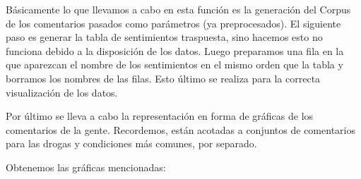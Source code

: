 \documentclass[spanish,]{article}
\newenvironment{Shaded}{\begin{snugshade}}{\end{snugshade}}
\newcommand{\KeywordTok}[1]{\textcolor[rgb]{0.13,0.29,0.53}{\textbf{#1}}}
\newcommand{\StringTok}[1]{\textcolor[rgb]{0.31,0.60,0.02}{#1}}
\newcommand{\ControlFlowTok}[1]{\textcolor[rgb]{0.13,0.29,0.53}{\textbf{#1}}}
\newcommand{\OperatorTok}[1]{\textcolor[rgb]{0.81,0.36,0.00}{\textbf{#1}}}
\newcommand{\NormalTok}[1]{#1}
\begin{document}
Básicamente lo que llevamos a cabo en esta función es la generación del
Corpus de los comentarios pasados como parámetros (ya preprocesados). El
siguiente paso es generar la tabla de sentimientos traspuesta, sino
hacemos esto no funciona debido a la disposición de los datos. Luego
preparamos una fila en la que aparezcan el nombre de los sentimientos en
el mismo orden que la tabla y borramos los nombres de las filas. Esto
último se realiza para la correcta visualización de los datos.

Por último se lleva a cabo la representación en forma de gráficas de los
comentarios de la gente. Recordemos, están acotadas a conjuntos de
comentarios para las drogas y condiciones más comunes, por separado.

Obtenemos las gráficas mencionadas:

\begin{Shaded}
\end{Shaded}

\begin{Shaded}
\end{Shaded}

\begin{Shaded}
\end{Shaded}
\end{document}
